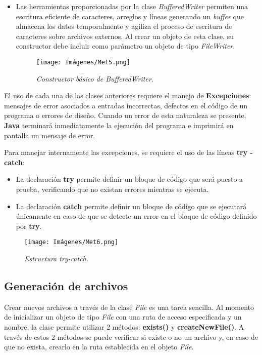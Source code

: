 \documentclass[letterpaper,12pt]{extarticle}
\begin{document}
\begin{itemize}
\item Las herramientas proporcionadas por la clase \textit{BufferedWriter} permiten una escritura eficiente de caracteres, arreglos y líneas generando un \textit{buffer} que almacena los datos temporalmente y agiliza el proceso de escritura de caracteres sobre archivos externos. Al crear un objeto de esta clase, su constructor debe incluir como parámetro un objeto de tipo \textit{FileWriter}.

\begin{figure}[h!]
\centering
\texttt{[image: Imágenes/Met5.png]}
\caption{\textit{Constructor básico de BufferedWriter.}}
\label{fig:Met5}
\end{figure}

\end{itemize}

El uso de cada una de las clases anteriores requiere el manejo de \textbf{Excepciones}: mensajes de error asociados a entradas incorrectas, defectos en el código de un programa o errores de diseño. Cuando un error de esta naturaleza se presente, \textbf{Java} terminará inmediatamente la ejecución del programa e imprimirá en pantalla un mensaje de error.

Para manejar internamente las excepciones, se requiere el uso de las líneas \textbf{try - catch}:

\begin{itemize}

\item La declaración \textbf{try} permite definir un bloque de código que será puesto a prueba, verificando que no existan errores mientras se ejecuta.

\item La declaración \textbf{catch} permite definir un bloque de código que se ejecutará únicamente en caso de que se detecte un error en el bloque de código definido por \textbf{try}.

\end{itemize}

\begin{figure}[h!]
\centering
\texttt{[image: Imágenes/Met6.png]}
\caption{\textit{Estructura try-catch.}}
\label{fig:Met6}
\end{figure}

\subsection{Generación de archivos}

\noindent Crear nuevos archivos a través de la clase \textit{File} es una tarea sencilla. Al momento de inicializar un objeto de tipo \textit{File} con una ruta de acceso especificada y un nombre, la clase permite utilizar 2 métodos: \textbf{exists()} y \textbf{createNewFile()}. A través de estos 2 métodos se puede verificar si existe o no un archivo y, en caso de que no exista, crearlo en la ruta establecida en el objeto \textit{File}.
\end{document}
